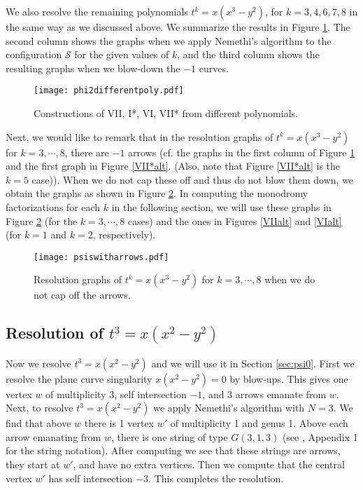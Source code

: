 \documentclass[11pt,letterpaper,reqno]{amsart}
\theoremstyle{remark}
\begin{document}
We also resolve the remaining polynomials $t^k=x(x^3-y^2)$, for $k=3,4,6,7,8$ in the same way as we discussed above. We summarize the results in Figure \ref{phi2differentpoly}. The second column shows the graphs when we apply Nemethi's algorithm to the configuration $\mathcal{S}$ for the given values of $k$, and the third column shows the resulting graphs when we blow-down the $-1$ curves.

\begin{figure}[htb]
{\texttt{[image: phi2differentpoly.pdf]}}
\caption{Constructions of VII, I*, VI, VII* from different polynomials.}
\label{phi2differentpoly}
\end{figure}


Next, we would like to remark that in the resolution graphs of $t^k=x(x^3-y^2)$ for $k=3, \cdots, 8$, there are $-1$ arrows (cf. the graphs in the first column of Figure \ref{phi2differentpoly} and the first graph in Figure \ref{VII*alt}. (Also, note that Figure \ref{VII*alt} is the $k=5$ case)). When we do not cap these off and thus do not blow them down, we obtain the graphs as shown in Figure \ref{table2}. In computing the monodromy factorizations for each $k$ in the following section, we will use these graphs in Figure \ref{table2} (for the $k=3, \cdots, 8$ cases) and the ones in Figures \ref{VIIalt} and \ref{VIalt} (for $k=1$ and $k=2$, respectively).

\begin{figure}[htb]
    \centering
{\texttt{[image: psiswitharrows.pdf]}}
\caption{Resolution graphs of $t^k=x(x^3-y^2)$ for $k=3, \cdots, 8$ when we do not cap off the arrows.}
\label{table2}
\end{figure} 

\subsection*{Resolution of \texorpdfstring{{\boldmath $t^3 = x(x^2-y^2)$}}{sec:g=1}}
\label{sec:g=1}

Now we resolve $t^3 = x(x^2-y^2)$ and we will use it in Section \ref{sec:psi0}. First we resolve the plane curve singularity $x(x^2-y^2)=0$ by blow-ups. This gives one vertex $w$ of multiplicity 3, self intersection $-1$, and 3 arrows emanate from $w$. Next, to resolve $t^3 = x(x^2-y^2)$ we apply Nemethi's algorithm with $N=3$. We find that above $w$ there is 1 vertex $w'$ of multiplicity 1 and genus 1. Above each arrow emanating from $w$, there is one string of type $G(3,1,3)$ (see \cite{Nemethi-lectures}, Appendix 1 for the string notation). After computing we see that these strings are arrows, they start at $w'$, and have no extra vertices. Then we compute that the central vertex $w'$ has self intersection $-3$. This completes the resolution.
\end{document}

